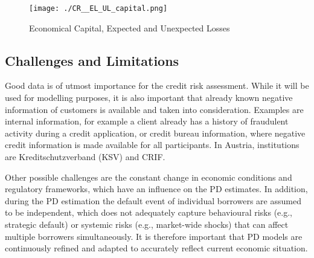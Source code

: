 \begin{figure}[H]
	\centering
	\texttt{[image: ./CR\_\_EL\_UL\_capital.png]}
    \caption{Economical Capital, Expected and Unexpected Losses}
    \label{fig:cr_elul}
\end{figure}

\subsection{Challenges and Limitations}

Good data is of utmost importance for the credit risk assessment. While it will be used for modelling purposes, it is also important that already known negative information of customers is available  and taken into consideration. Examples are internal information, for example a client already has a history of fraudulent activity during a credit application, or credit bureau information, where negative credit information is made available for all participants. In Austria, institutions are Kreditschutzverband (KSV) and CRIF. 

Other possible challenges are the constant change in economic conditions and regulatory frameworks, which have an influence on the PD estimates. In addition, during the PD estimation the default event of individual borrowers are assumed to be independent, which does not adequately capture behavioural risks (e.g., strategic default) or systemic risks (e.g., market-wide shocks) that can affect multiple borrowers simultaneously. It is therefore important that PD models are continuously refined and adapted to accurately reflect current economic situation.